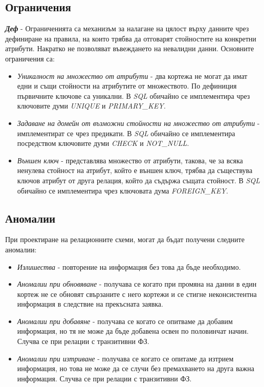 \documentclass[fleqn,12pt]{article}
\begin{document}
\subsection{Ограничения}

\textbf{\textit{Деф}} - Ограниченията са механизъм за налагане на цялост върху данните чрез дефиниране на правила, на които трябва да отговарят стойностите на конкретни атрибути.
Накратко не позволяват въвеждането на невалидни данни.
Основните ограничения са:
\begin{itemize}
    \item \textit{Уникалност на множество от атрибути} - два кортежа не могат да имат едни и същи стойности на атрибутите от множеството.
    По дефиниция първичните ключове са уникални.
    В \textit{SQL} обичайно се имплементира чрез ключовите думи \textit{UNIQUE} и \textit{PRIMARY\_KEY}.
    \item \textit{Задаване на домейн от възможни стойности на множество от атрибути} - имплементират се чрез предикати.
    В \textit{SQL} обичайно се имплементира посредством ключовите думи \textit{CHECK} и \textit{NOT\_NULL}.
    \item \textit{Външен ключ} - представлява множество от атрибути, такова, че за всяка ненулева стойност на атрибут, който е външен ключ, трябва да съществува ключов атрибут от друга релация, който да съдържа същата стойност.
    В \textit{SQL} обичайно се имплементира чрез ключовата дума \textit{FOREIGN\_KEY}.
\end{itemize}

\subsection{Аномалии}

При проектиране на релационните схеми, могат да бъдат получени следните аномалии:
\begin{itemize}
    \item \textit{Излишества} - повторение на информация без това да бъде необходимо.
    \item \textit{Аномалии при обновяване} - получава се когато при промяна на данни в един кортеж не се обновят свързаните с него кортежи и се стигне неконсистентна информация в следствие на прекъсната заявка.
    \item \textit{Аномалии при добавяне} - получава се когато се опитваме да добавим информация, но тя не може да бъде добавена освен по половинчат начин. Случва се при релации с транзитивни ФЗ.
    \item \textit{Аномалии при изтриване} - получава се когато се опитаме да изтрием информация, но това не може да се случи без премахването на друга важна информация. Случва се при релации с транзитивни ФЗ.
\end{itemize}
\end{document}

